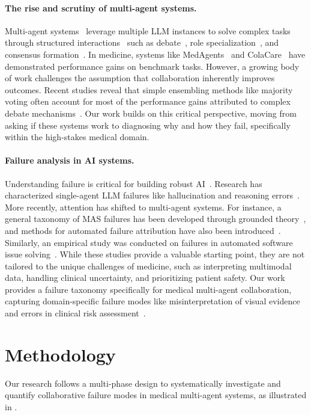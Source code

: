 \paragraph{The rise and scrutiny of multi-agent systems.}
Multi-agent systems~\cite{kim2024health} leverage multiple LLM instances to solve complex tasks through structured interactions~\cite{tran2025mas_survey} such as debate~\cite{du2023improving,hong2024metagpt}, role specialization~\cite{tang2024medagents}, and consensus formation~\cite{chen2024reconcile}. In medicine, systems like MedAgents~\cite{tang2024medagents} and ColaCare~\cite{wang2025colacare} have demonstrated performance gains on benchmark tasks. However, a growing body of work challenges the assumption that collaboration inherently improves outcomes. Recent studies reveal that simple ensembling methods like majority voting often account for most of the performance gains attributed to complex debate mechanisms~\cite{choi2025debate, kaesberg2025voting, liang2023encouraging}. Our work builds on this critical perspective, moving from asking if these systems work to diagnosing why and how they fail, specifically within the high-stakes medical domain.

\paragraph{Failure analysis in AI systems.}
Understanding failure is critical for building robust AI~\cite{arrieta2020explainable}. Research has characterized single-agent LLM failures like hallucination and reasoning errors~\cite{qiu2025quantifying,huang2025survey}. More recently, attention has shifted to multi-agent systems. For instance, a general taxonomy of MAS failures has been developed through grounded theory~\cite{pan2025multiagent}, and methods for automated failure attribution have also been introduced~\cite{zhang2025which}. Similarly, an empirical study was conducted on failures in automated software issue solving~\cite{liu2025empirical, cemri2025multi}. While these studies provide a valuable starting point, they are not tailored to the unique challenges of medicine, such as interpreting multimodal data, handling clinical uncertainty, and prioritizing patient safety. Our work provides a failure taxonomy specifically for medical multi-agent collaboration, capturing domain-specific failure modes like misinterpretation of visual evidence and errors in clinical risk assessment~\cite{esteva2019guide}.

\section{Methodology}
Our research follows a multi-phase design to systematically investigate and quantify collaborative failure modes in medical multi-agent systems, as illustrated in .

